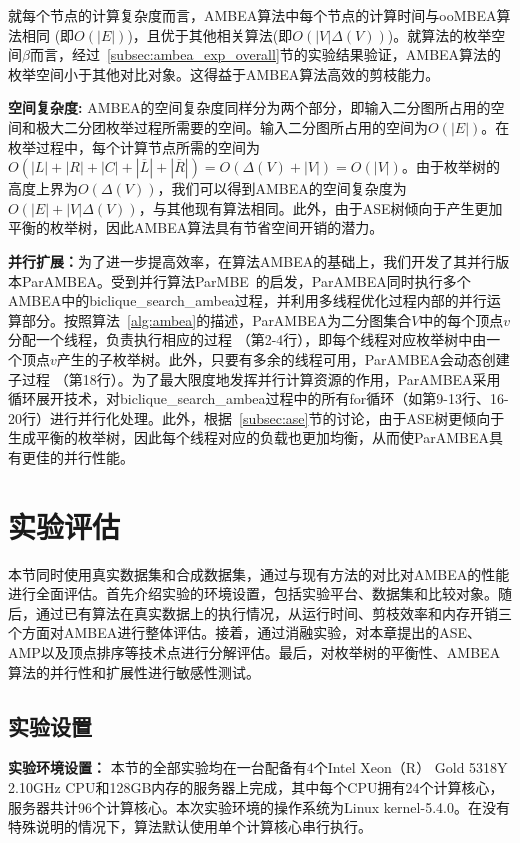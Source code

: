 就每个节点的计算复杂度而言，AMBEA算法中每个节点的计算时间与ooMBEA算法相同 (即$O(|E|)$)，且优于其他相关算法(即$O(|V|\Delta(V))$)。就算法的枚举空间$\beta$而言，经过~\ref{subsec:ambea_exp_overall}节的实验结果验证，AMBEA算法的枚举空间小于其他对比对象。这得益于AMBEA算法高效的剪枝能力。


\textbf{空间复杂度: } AMBEA的空间复杂度同样分为两个部分，即输入二分图所占用的空间和极大二分团枚举过程所需要的空间。输入二分图所占用的空间为$O(|E|)$。在枚举过程中，每个计算节点所需的空间为$O(|L|+|R|+|C|+|\overline{L}| + |\overline{R}|) = O(\Delta(V) + |V|) = O(|V|)$。由于枚举树的高度上界为$O(\Delta(V))$，我们可以得到AMBEA的空间复杂度为$O(|E|+|V|\Delta(V))$，与其他现有算法相同。此外，由于ASE树倾向于产生更加平衡的枚举树，因此AMBEA算法具有节省空间开销的潜力。

\textbf{并行扩展：}为了进一步提高效率，在算法AMBEA的基础上，我们开发了其并行版本ParAMBEA。受到并行算法ParMBE~\cite{parMBE18}的启发，ParAMBEA同时执行多个AMBEA中的\textsf{biclique\_search\_ambea}过程，并利用多线程优化过程内部的并行运算部分。按照算法~\ref{alg:ambea}的描述，ParAMBEA为二分图集合$V$中的每个顶点$v$分配一个线程，负责执行相应的过程 （第2-4行），即每个线程对应枚举树中由一个顶点$v$产生的子枚举树。此外，只要有多余的线程可用，ParAMBEA会动态创建子过程 （第18行）。为了最大限度地发挥并行计算资源的作用，ParAMBEA采用循环展开技术，对\textsf{biclique\_search\_ambea}过程中的所有for循环（如第9-13行、16-20行）进行并行化处理。此外，根据~\ref{subsec:ase}节的讨论，由于ASE树更倾向于生成平衡的枚举树，因此每个线程对应的负载也更加均衡，从而使ParAMBEA具有更佳的并行性能。


\section{实验评估}

本节同时使用真实数据集和合成数据集，通过与现有方法的对比对AMBEA的性能进行全面评估。首先介绍实验的环境设置，包括实验平台、数据集和比较对象。随后，通过已有算法在真实数据上的执行情况，从运行时间、剪枝效率和内存开销三个方面对AMBEA进行整体评估。接着，通过消融实验，对本章提出的ASE、AMP以及顶点排序等技术点进行分解评估。最后，对枚举树的平衡性、AMBEA算法的并行性和扩展性进行敏感性测试。

\subsection{实验设置}

\textbf{实验环境设置：} 本节的全部实验均在一台配备有4个Intel Xeon（R） Gold 5318Y 2.10GHz CPU和128GB内存的服务器上完成，其中每个CPU拥有24个计算核心，服务器共计96个计算核心。本次实验环境的操作系统为Linux kernel-5.4.0。在没有特殊说明的情况下，算法默认使用单个计算核心串行执行。


